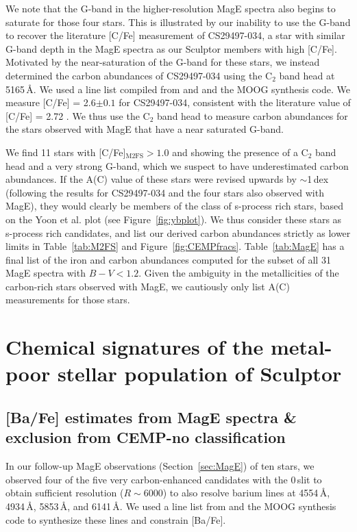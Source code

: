 \documentclass{emulateapj-rtx4}
\begin{document}
We note that the G-band in the higher-resolution MagE spectra also begins to saturate for those four stars. This is illustrated by our inability to use the G-band to recover the literature [C/Fe] measurement of CS29497-034, a star with similar G-band depth in the MagE spectra as our Sculptor members with high [C/Fe]. Motivated by the near-saturation of the G-band for these stars, we instead determined the carbon abundances of CS29497-034 using the C$_2$ band head at 5165\,\AA. We used a line list compiled from \citet{slc+09, sck+16} and \citet{mpv+14} and the MOOG synthesis code. We measure [C/Fe] = 2.6$\pm0.1$ for CS29497-034, consistent with the literature value of [C/Fe] = 2.72 \citep{wbc+07}. We thus use the C$_2$ band head to measure carbon abundances for the stars observed with MagE that have a near saturated G-band.

We find 11 stars with [C/Fe]$_{\text{M2FS}} > 1.0$ and showing the presence of a C$_2$ band head and a very strong G-band, which we suspect to have underestimated carbon abundances. If the A(C) value of these stars were revised upwards by $\sim$1\,dex (following the results for CS29497-034 and the four stars also observed with MagE), they would clearly be members of the class of s-process rich stars, based on the Yoon et al. plot (see Figure~\ref{fig:ybplot}). 
We thus consider these stars as s-process rich candidates, and list our derived carbon abundances strictly as lower limits in Table~\ref{tab:M2FS} and Figure~\ref{fig:CEMPfracs}.
Table~\ref{tab:MagE} has a final list of the iron and carbon abundances computed 
for the subset of all 31 MagE spectra with $B-V < 1.2$. 
Given the ambiguity in the metallicities of the carbon-rich stars observed with MagE, we cautiously only list A(C) measurements for those stars. 


\section{Chemical signatures of the metal-poor stellar population of Sculptor}
\label{sec:additional}


\subsection{[Ba/Fe] estimates from MagE spectra \& exclusion from CEMP-no classification}
\label{sec:bafe}

In our follow-up MagE observations (Section~\ref{sec:MagE}) of ten stars, we observed four of the five very carbon-enhanced candidates with the 0\,slit 
to obtain sufficient resolution ($R\sim6000$) to also resolve barium lines 
at 4554\,\AA, 4934\,\AA, 5853\,\AA, and 6141\,\AA. 
We used a line list from \citet{slc+09, sck+16} and the MOOG 
synthesis code to synthesize these lines and constrain [Ba/Fe].
\end{document}
